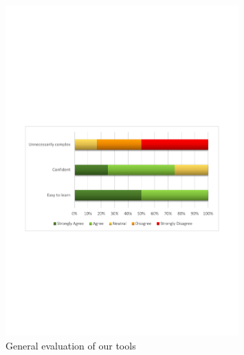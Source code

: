 \begin{figure}[H]
  \centering
    \includegraphics[width=0.8\textwidth]{images/charts/tool_general.pdf}
	\caption[General Evaluation]{General evaluation of our tools}
	\label{fig:tool_general}
\end{figure}

